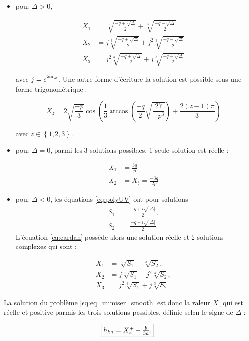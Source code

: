 \begin{itemize}
\item pour $\Delta >0$, 

\begin{subequations}
\begin{align}
X_1 &= \sqrt[3]{\frac{-q+\sqrt{\Delta}}{2}}+\sqrt[3]{\frac{-q-\sqrt{\Delta}}{2}}\\
X_2 &= j\sqrt[3]{\frac{-q+\sqrt{\Delta}}{2}}+j^2\sqrt[3]{\frac{-q-\sqrt{\Delta}}{2}}\\
X_3 &= j^2\sqrt[3]{\frac{-q+\sqrt{\Delta}}{2}}+j\sqrt[3]{\frac{-q-\sqrt{\Delta}}{2}}
\end{align}
\end{subequations}

avec $j = e^{\sfrac{2i\pi}{3}}$. Une autre forme d'écriture la solution est possible sous une forme trigonométrique : 

\begin{equation}
X_{z} = 2\sqrt{\frac{-p}{3}} \cos \left(\frac{1}{3} \arccos\left(\frac{-q}{2}\sqrt{\frac{27}{-p^3}}\right) + \frac{2(z-1)\pi}{3}\right)
\end{equation}

avec $z \in \left\lbrace 1,2,3 \right\rbrace$.


\item pour $\Delta = 0$, parmi les 3 solutions possibles, 1 seule solution est réelle : 

\begin{subequations}
\begin{align}
X_1 &= \frac{3q}{p},\\
X_2 &= X_3 = \frac{-3q}{2p}
\end{align}
\end{subequations}

\item pour $\Delta < 0$, les équations \ref{eq:polyUV} ont pour solutions 
\begin{align}
S_1 &= \frac{-q+i\sqrt{\vert\Delta \vert}}{2},\\
S_2 &= \frac{-q-i\sqrt{\vert \Delta \vert}}{2}. 
\end{align} 
L'équation \ref{eq:cardan} possède alors une solution réelle et 2 solutions complexes qui sont 
: 

\begin{subequations}
\begin{align}
X_1 &= \sqrt[3]{S_1}+\sqrt[3]{S_2},\\
X_2 &= j\sqrt[3]{S_1}+j^2\sqrt[3]{S_2},\\
X_3 &= j^2\sqrt[3]{S_1}+j\sqrt[3]{S_2}.
\end{align}
\end{subequations}
\end{itemize}

La solution du problème \ref{eq:eq_mimiser_smooth} est donc la valeur $X_z$ qui est réelle et positive parmis les trois solutions possibles, définie selon le signe de $\Delta$ : 

\begin{equation}
\fbox{$
h_{kn} = X_{z}^+-\frac{b}{3a}.
$}
\end{equation}
